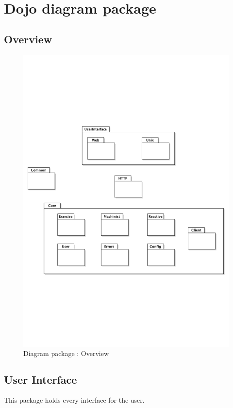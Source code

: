 \chapter{Dojo diagram package}

\section{Overview}
	\begin{figure}[ht]
			\begin{center}
				\includegraphics[width=\textwidth,  trim=2cm 6cm 2cm 7cm]{UML_figure/DP/general/DP_General.pdf}
				\caption{Diagram package : Overview}
			\end{center}
	\end{figure}
	\section{User Interface}
		This package holds every interface for the user.
